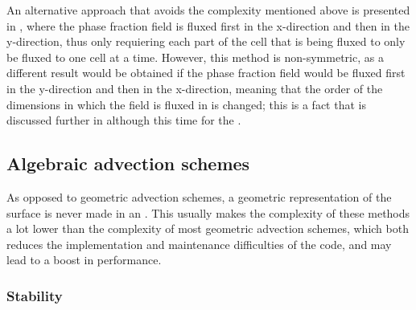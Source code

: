 An alternative approach that avoids the complexity mentioned above is presented in \citep{Aulisa2003}, where the phase fraction field is fluxed first in the x-direction and then in the y-direction, thus only requiering each part of the cell that is being fluxed to only be fluxed to one cell at a time. However, this method is non-symmetric, as a different result would be obtained if the phase fraction field would be fluxed first in the y-direction and then in the x-direction, meaning that the order of the dimensions in which the field is fluxed in is changed; this is a fact that is discussed further in \citep{Ubbink1999} although this time for the  .

\subsection{Algebraic advection schemes}

As opposed to geometric advection schemes, a geometric representation of the surface is never made in an . This usually makes the complexity of these methods a lot lower than the complexity of most geometric advection schemes, which both reduces the implementation and maintenance difficulties of the code, and may lead to a boost in performance.




\subsubsection{Stability}


